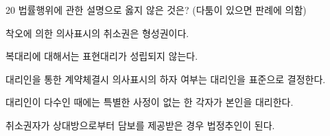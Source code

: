 \begin{question}{20}
법률행위에 관한 설명으로 옳지 않은 것은? (다툼이 있으면 판례에 의함)
\begin{choices}
  \item 착오에 의한 의사표시의 취소권은 형성권이다.
  \item 복대리에 대해서는 표현대리가 성립되지 않는다.
  \item 대리인을 통한 계약체결시 의사표시의 하자 여부는 대리인을 표준으로 결정한다.
  \item 대리인이 다수인 때에는 특별한 사정이 없는 한 각자가 본인을 대리한다.
  \item 취소권자가 상대방으로부터 담보를 제공받은 경우 법정추인이 된다.
\end{choices}
\end{question}
